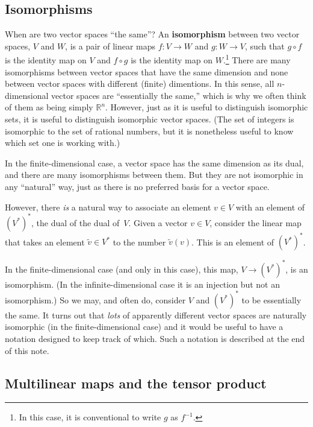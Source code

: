 \documentclass[10pt, a4paper, twocolumn]{article}
\newcommand{\R}{\mathbb{R}}
\newcommand{\defn}[1]{\textbf{#1}}
\begin{document}
\subsection{Isomorphisms}

When are two vector spaces “the same”? An \defn{isomorphism} between two vector
spaces, $V$ and $W$, is a pair of linear maps $f:V \to W$ and $g:W \to V$, such that
$g \circ f$ is the identity map on $V$ and $f \circ g$ is the identity map on
$W$.\footnote{In this case, it is conventional to write $g$ as $f^{-1}$.} There
are many isomorphisms between vector spaces that have the same dimension and
none between vector spaces with different (finite) dimentions. In this sense,
all $n$-dimensional vector spaces are “essentially the same,” which is why we
often think of them as being simply $\R^n$. However, just as it is useful to
distinguish isomorphic sets, it is useful to distinguish isomorphic vector
spaces. (The set of integers is isomorphic to the set of rational numbers, but
it is nonetheless useful to know which set one is working with.)

In the finite-dimensional case, a vector space has the same dimension as its
dual, and there are many isomorphisms between them. But they are not isomorphic
in any “natural” way, just as there is no preferred basis for a vector space.

However, there \emph{is} a natural way to associate an element $v\in V$ with an
element of $(V^*)^*$, the dual of the dual of~$V$. Given a vector $v\in V$,
consider the linear map that takes an element $\tilde{v} \in V^*$ to the number
$\tilde{v}(v)$. This is an element of $(V^*)^*$.

In the finite-dimensional case (and only in this case), this map, $V\to (V^*)^*$,
is an isomorphism. (In the infinite-dimensional case it is an injection but not
an isomorphism.) So we may, and often do, consider $V$ and $(V^*)^*$ to be
essentially the same. It turns out that \emph{lots} of apparently different
vector spaces are naturally isomorphic (in the finite-dimensional case) and it
would be useful to have a notation designed to keep track of which. Such a
notation is described at the end of this note.

\subsection{Multilinear maps and the tensor product}
\end{document}
